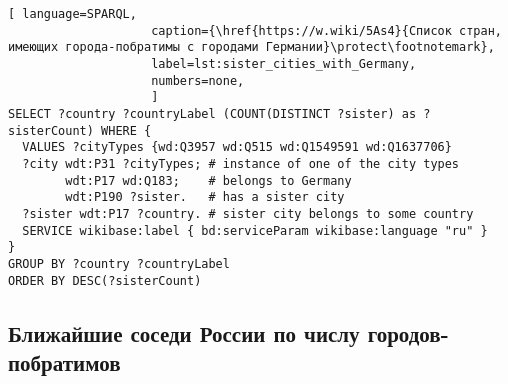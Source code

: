 \begin{lstlisting}[ language=SPARQL, 
                    caption={\href{https://w.wiki/5As4}{Список стран, имеющих города-побратимы с городами Германии}\protect\footnotemark},
                    label=lst:sister_cities_with_Germany,
                    numbers=none,
                    ]
SELECT ?country ?countryLabel (COUNT(DISTINCT ?sister) as ?sisterCount) WHERE {
  VALUES ?cityTypes {wd:Q3957 wd:Q515 wd:Q1549591 wd:Q1637706}
  ?city wdt:P31 ?cityTypes; # instance of one of the city types
        wdt:P17 wd:Q183;    # belongs to Germany
        wdt:P190 ?sister.   # has a sister city
  ?sister wdt:P17 ?country. # sister city belongs to some country
  SERVICE wikibase:label { bd:serviceParam wikibase:language "ru" }
}
GROUP BY ?country ?countryLabel
ORDER BY DESC(?sisterCount)\end{lstlisting}%





\subsection{Ближайшие соседи России по числу городов-побратимов}


